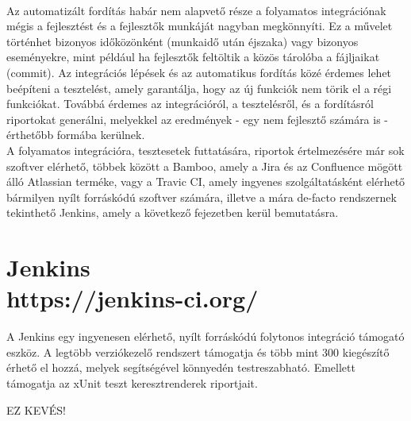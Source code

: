 \\
Az automatizált fordítás habár nem alapvető része a folyamatos integrációnak mégis a fejlesztést és a fejlesztők munkáját nagyban megkönnyíti. Ez a művelet történhet bizonyos időközönként (munkaidő után éjszaka) vagy bizonyos eseményekre, mint például ha fejlesztők feltöltik a közös tárolóba a fájljaikat (commit). Az integrációs lépések és az automatikus fordítás közé érdemes lehet beépíteni a tesztelést, amely garantálja, hogy az új funkciók nem törik el a régi funkciókat. Továbbá érdemes az integrációról, a tesztelésről, és a fordításról riportokat generálni, melyekkel az eredmények - egy nem fejlesztő számára is - érthetőbb formába kerülnek.
\\
A folyamatos integrációra, tesztesetek futtatására, riportok értelmezésére már sok szoftver elérhető, többek között a Bamboo, amely a Jira és az Confluence mögött álló Atlassian terméke, vagy a Travic CI, amely ingyenes szolgáltatásként elérhető bármilyen nyílt forráskódú szoftver számára, illetve a mára de-facto rendszernek tekinthető Jenkins, amely a következő fejezetben kerül bemutatásra.

\section{Jenkins\\\small{https://jenkins-ci.org/}}
A Jenkins egy ingyenesen elérhető, nyílt forráskódú folytonos integráció támogató eszköz. A legtöbb verziókezelő rendszert támogatja és több mint 300 kiegészítő érhető el hozzá, melyek segítségével könnyedén testreszabható. Emellett támogatja az xUnit teszt keresztrenderek riportjait.

EZ KEVÉS!

